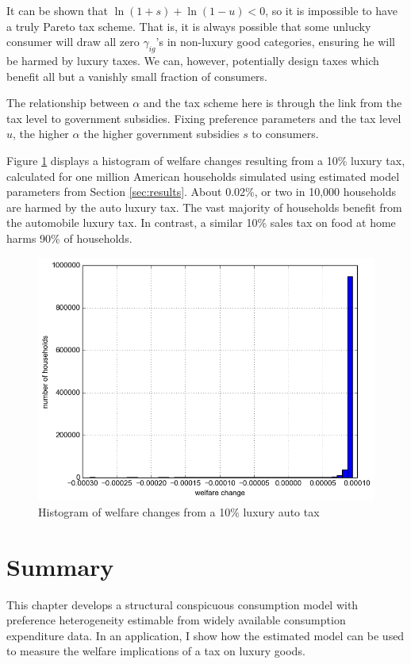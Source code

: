 It can be shown that $\ln(1+s) + \ln(1 - u) < 0$, so it is impossible to have a truly Pareto tax scheme.  That is, it is always possible that some unlucky consumer will draw all zero $\gamma_{ig}$'s in non-luxury good categories, ensuring he will be harmed by luxury taxes.  We can, however, potentially design taxes which benefit all but a vanishly small fraction of consumers.

The relationship between $\alpha$ and the tax scheme here is through the link from the tax level to government subsidies.  Fixing preference parameters and the tax level $u$, the higher $\alpha$ the higher government subsidies $s$ to consumers.

Figure \ref{fig:wel_change_10} displays a histogram of welfare changes resulting from a 10\% luxury tax, calculated for one million American households simulated using estimated model parameters from Section \ref{sec:results}.  About 0.02\%, or two in 10,000 households are harmed by the auto luxury tax.  The vast majority of households benefit from the automobile luxury tax.  In contrast, a similar 10\% sales tax on food at home harms 90\% of households.

\begin{figure}
    \centering
	\includegraphics[scale=.6]{pics/tax_hist_Car10.png}
    \caption{Histogram of welfare changes from a 10\% luxury auto tax}
    \label{fig:wel_change_10}
\end{figure}

\section{Summary}
This chapter develops a structural conspicuous consumption model with preference heterogeneity estimable from widely available consumption expenditure data.  In an application, I show how the estimated model can be used to measure the welfare implications of a tax on luxury goods.

